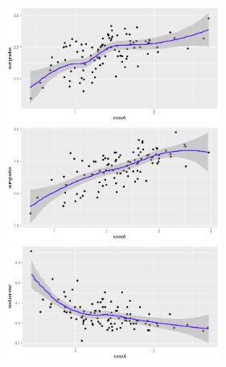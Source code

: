 \documentclass{article}
\begin{document}
\begin{figure}[htbp!]
  \centering{}
  \includegraphics[width=7cm]{img/coopAsum100nonCW}\quad\quad
  \includegraphics[width=7cm]{img/coopAsumS100nonCW}\\
  \includegraphics[width=7cm]{img/coopAmod100nonCW}\quad\quad

\end{figure}
\end{document}
